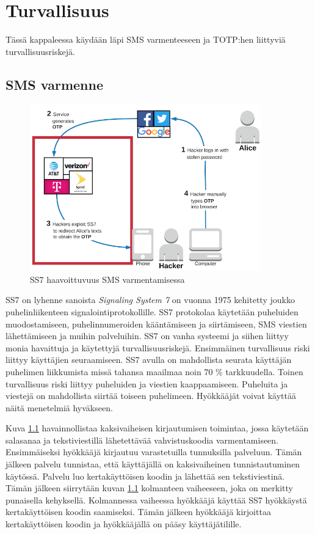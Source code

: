 \chapter{Turvallisuus\label{Turvallisuus}}

Tässä kappaleessa käydään läpi SMS varmenteeseen ja TOTP:hen liittyviä turvallisuusriskejä. 

\section{SMS varmenne}
\begin{figure}[ht]
    \centering
    \includegraphics[width=10cm]{template/figures/SS7 attack vulnerable.png}
    \caption{SS7 haavoittuvuus SMS varmentamisessa \citep{2FA_SMS}}
    \label{fig:ss7SMSM}
\end{figure}

SS7 on lyhenne sanoista \emph{Signaling System 7} on vuonna 1975 kehitetty joukko puhelinliikenteen signalointiprotokollille. SS7 protokolaa käytetään puheluiden muodostamiseen, puhelinnumeroiden kääntämiseen ja siirtämiseen, SMS viestien lähettämiseen ja muihin palveluihin. SS7 on vanha systeemi ja siihen liittyy monia havaittuja ja käytettyjä turvallisuusriskejä. Ensimmäinen turvallisuus riski liittyy käyttäjien seuraamiseen. SS7 avulla on mahdollista seurata käyttäjän puhelimen liikkumista missä tahansa maailmaa noin 70 \% tarkkuudella. Toinen turvallisuus riski liittyy puheluiden ja viestien kaappaamiseen. Puheluita ja viestejä on mahdollista siirtää toiseen puhelimeen. Hyökkääjät voivat käyttää näitä menetelmiä hyväkseen. \citep{ss7}

Kuva \ref{fig:ss7SMSM} havainnollistaa kaksivaiheisen kirjautumisen toimintaa, jossa käytetään salasanaa ja tekstiviestillä lähetettävää vahvistuskoodia varmentamiseen. Ensimmäiseksi hyökkääjä kirjautuu varastetuilla tunnuksilla palveluun. Tämän jälkeen palvelu tunnistaa, että käyttäjällä on kaksivaiheinen tunnistautuminen käytössä. Palvelu luo kertakäyttöisen koodin ja lähettää sen tekstiviestinä. Tämän jälkeen siirrytään kuvan \ref{fig:ss7SMSM}  kolmanteen vaiheeseen, joka on merkitty punaisella kehyksellä. Kolmannessa vaiheessa hyökkääjä käyttää SS7 hyökkäystä kertakäyttöisen koodin saamiseksi. Tämän jälkeen hyökkääjä kirjoittaa kertakäyttöisen koodin ja hyökkääjällä on pääsy käyttäjätilille.


